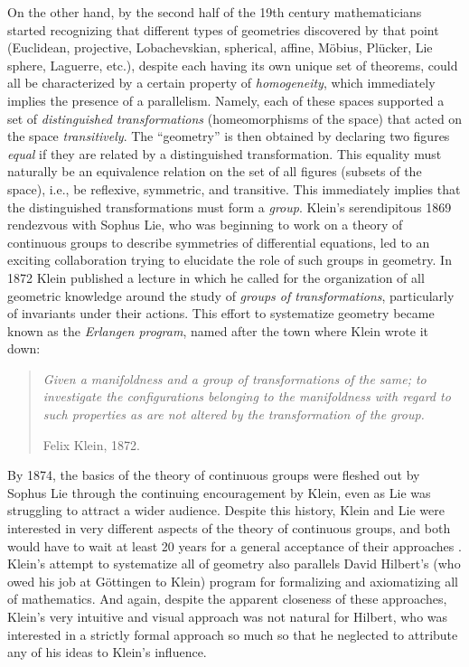 \begin{hrem*}
    On the other hand, by the second half of the 19th century mathematicians started recognizing that different types of geometries discovered by that point (Euclidean, projective, Lobachevskian, spherical, affine, M\"obius, Pl\"ucker, Lie sphere, Laguerre, etc.), despite each having its own unique set of theorems, could all be characterized by a certain property of \emph{homogeneity}, which immediately implies the presence of a parallelism. Namely, each of these spaces supported a set of \emph{distinguished transformations} (homeomorphisms of the space) that acted on the space \emph{transitively}. The ``geometry'' is then obtained by declaring two figures \emph{equal} if they are related by a distinguished transformation. This equality must naturally be an equivalence relation on the set of all figures (subsets of the space), i.e., be reflexive, symmetric, and transitive. This immediately implies that the distinguished transformations must form a \emph{group}. Klein's serendipitous 1869 rendezvous with Sophus Lie, who was beginning to work on a theory of continuous groups to describe symmetries of differential equations, led to an exciting collaboration trying to elucidate the role of such groups in geometry. In 1872 Klein published a lecture in which he called for the organization of all geometric knowledge around the study of \emph{groups of transformations}, particularly of invariants under their actions. This effort to systematize geometry became known as the \emph{Erlangen program}, named after the town where Klein wrote it down:
    \begin{quote}
        \small
        \emph{Given a manifoldness and a group of transformations of the same; to investigate the configurations belonging to the manifoldness with regard to such properties as are not altered by the transformation of the group.}
        
        \hfill Felix Klein, 1872.
    \end{quote}
    By 1874, the basics of the theory of continuous groups were fleshed out by Sophus Lie through the continuing encouragement by Klein, even as Lie was struggling to attract a wider audience. Despite this history, Klein and Lie were interested in very different aspects of the theory of continuous groups, and both would have to wait at least 20 years for a general acceptance of their approaches \cite{Birkhoff}. Klein's attempt to systematize all of geometry also parallels David Hilbert's (who owed his job at G\"ottingen to Klein) program for formalizing and axiomatizing all of mathematics. And again, despite the apparent closeness of these approaches, Klein's very intuitive and visual approach was not natural for Hilbert, who was interested in a strictly formal approach so much so that he neglected to attribute any of his ideas to Klein's influence.
    

\end{hrem*}
